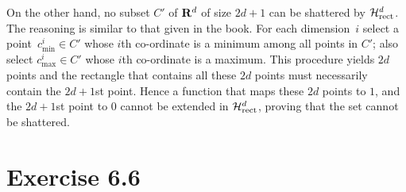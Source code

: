 On the other hand, no subset $C'$ of $\mathbf{R}^d$ of size $2d + 1$ can be
shattered by $\mathcal{H}_{\text{rect}}^{d}$. The reasoning is similar to that given in the book.
For each dimension~$i$ select a point~$c_{\text{min}}^i \in C'$ whose $i$th
co-ordinate is a minimum among all points in $C'$; also select
$c_{\text{max}}^i \in C'$ whose $i$th co-ordinate is a maximum. This procedure
yields $2d$ points and the rectangle that contains all these $2d$ points must
necessarily contain the $2d + 1$st point. Hence a function that maps these $2d$
points to $1$, and the $2d + 1$st point to $0$ cannot be extended in
$\mathcal{H}_{\text{rect}}^{d}$, proving that the set cannot be shattered.

\section*{Exercise 6.6}

